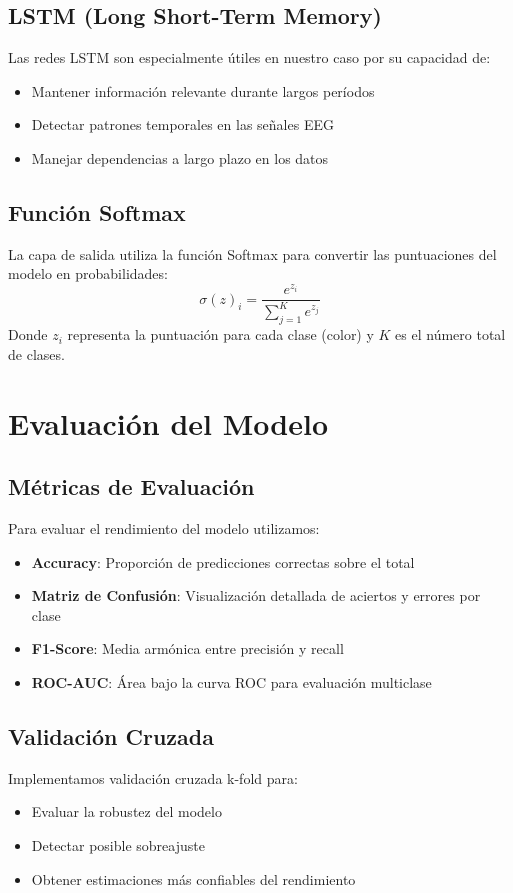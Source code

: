 \subsection{LSTM (Long Short-Term Memory)}
Las redes LSTM son especialmente útiles en nuestro caso por su capacidad de:
\begin{itemize}
    \item Mantener información relevante durante largos períodos
    \item Detectar patrones temporales en las señales EEG
    \item Manejar dependencias a largo plazo en los datos
\end{itemize}

\subsection{Función Softmax}
La capa de salida utiliza la función Softmax para convertir las puntuaciones del modelo en probabilidades:
\begin{equation}
    \sigma(z)_i = \frac{e^{z_i}}{\sum_{j=1}^K e^{z_j}}
\end{equation}
Donde $z_i$ representa la puntuación para cada clase (color) y $K$ es el número total de clases.

\section{Evaluación del Modelo}

\subsection{Métricas de Evaluación}
Para evaluar el rendimiento del modelo utilizamos:
\begin{itemize}
    \item \textbf{Accuracy}: Proporción de predicciones correctas sobre el total
    \item \textbf{Matriz de Confusión}: Visualización detallada de aciertos y errores por clase
    \item \textbf{F1-Score}: Media armónica entre precisión y recall
    \item \textbf{ROC-AUC}: Área bajo la curva ROC para evaluación multiclase
\end{itemize}

\subsection{Validación Cruzada}
Implementamos validación cruzada k-fold para:
\begin{itemize}
    \item Evaluar la robustez del modelo
    \item Detectar posible sobreajuste
    \item Obtener estimaciones más confiables del rendimiento
\end{itemize}